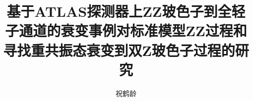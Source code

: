 \documentclass[doctor,english,pdf]{ustcthesis}
\title{基于ATLAS探测器上ZZ玻色子到全轻子通道的衰变事例对标准模型ZZ过程和寻找重共振态衰变到双Z玻色子过程的研究}
\author{祝鹤龄}
\begin{document}
\maketitle

\frontmatter
\linenumbers


\tableofcontents
\listoffigures
\listoftables

\makededicate
\newpage

\mainmatter










\appendix
%

\backmatter
%
\end{document}
